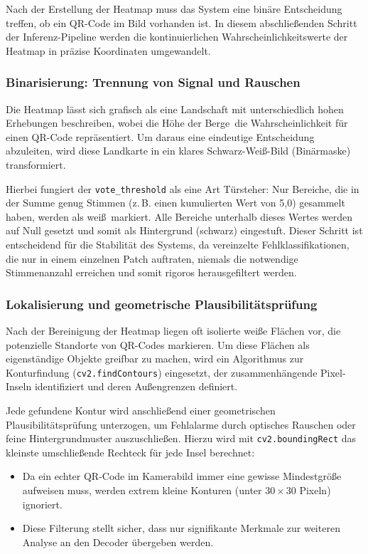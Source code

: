 \documentclass[
    a4paper,        %
    11pt,           %
    ngerman,        %
    parskip=half,   %
    listof=totoc,   %
    bibliography=totoc %
]{scrartcl}
\begin{document}
Nach der Erstellung der Heatmap muss das System eine binäre Entscheidung treffen, ob ein QR-Code im Bild vorhanden ist. %
In diesem abschließenden Schritt der Inferenz-Pipeline werden die kontinuierlichen Wahrscheinlichkeitswerte der Heatmap in präzise Koordinaten umgewandelt. %

\subsubsection{Binarisierung: Trennung von Signal und Rauschen}

Die Heatmap lässt sich grafisch als eine Landschaft mit unterschiedlich hohen Erhebungen beschreiben, wobei die Höhe der \glqq Berge\grqq\ die Wahrscheinlichkeit für einen QR-Code repräsentiert. %
Um daraus eine eindeutige Entscheidung abzuleiten, wird diese Landkarte in ein klares Schwarz-Wei\ss-Bild (Binärmaske) transformiert. %

Hierbei fungiert der \texttt{vote\_threshold} als eine Art \glqq Türsteher\grqq: Nur Bereiche, die in der Summe genug Stimmen (z.\,B. einen kumulierten Wert von 5,0) gesammelt haben, werden als wei\ss\ markiert. %
Alle Bereiche unterhalb dieses Wertes werden auf Null gesetzt und somit als Hintergrund (schwarz) eingestuft. %
Dieser Schritt ist entscheidend für die Stabilität des Systems, da vereinzelte Fehlklassifikationen, die nur in einem einzelnen Patch auftraten, niemals die notwendige Stimmenanzahl erreichen und somit rigoros herausgefiltert werden. %

\subsubsection{Lokalisierung und geometrische Plausibilitätsprüfung}

Nach der Bereinigung der Heatmap liegen oft isolierte wei\ss e Flächen vor, die potenzielle Standorte von QR-Codes markieren. %
Um diese Flächen als eigenständige Objekte greifbar zu machen, wird ein Algorithmus zur Konturfindung (\texttt{cv2.findContours}) eingesetzt, der zusammenhängende Pixel-Inseln identifiziert und deren Au\ss engrenzen definiert. %



Jede gefundene Kontur wird anschließend einer geometrischen Plausibilitätsprüfung unterzogen, um Fehlalarme durch optisches Rauschen oder feine Hintergrundmuster auszuschlie\ss en. %
Hierzu wird mit \texttt{cv2.boundingRect} das kleinste umschlie\ss ende Rechteck für jede Insel berechnet: %
\begin{itemize}
    \item Da ein echter QR-Code im Kamerabild immer eine gewisse Mindestgröße aufweisen muss, werden extrem kleine Konturen (unter $30 \times 30$ Pixeln) ignoriert. %
    \item Diese Filterung stellt sicher, dass nur signifikante Merkmale zur weiteren Analyse an den Decoder übergeben werden. %
\end{itemize}
\end{document}
